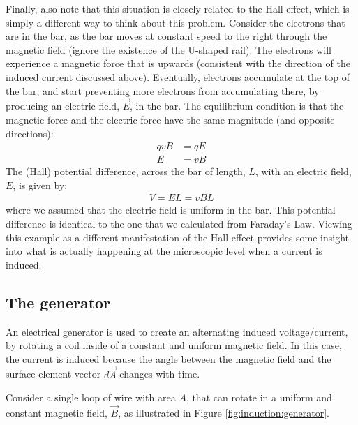 Finally, also note that this situation is closely related to the Hall effect, which is simply a different way to think about this problem. Consider the electrons that are in the bar, as the bar moves at constant speed to the right through the magnetic field (ignore the existence of the U-shaped rail). The electrons will experience a magnetic force that is upwards (consistent with the direction of the induced current discussed above). Eventually, electrons accumulate at the top of the bar, and start preventing more electrons from accumulating there, by producing an electric field, $\vec E$, in the bar. The equilibrium condition is that the magnetic force and the electric force have the same magnitude (and opposite directions):
\begin{align*}
qvB &= qE\\
E &= vB
\end{align*}
The (Hall) potential difference, across the bar of length, $L$, with an electric field, $E$, is given by:
\begin{align*}
V = EL = vBL
\end{align*}
where we assumed that the electric field is uniform in the bar. This potential difference is identical to the one that we calculated from Faraday's Law. Viewing this example as a different manifestation of the Hall effect provides some insight into what is actually happening at the microscopic level when a current is induced. 
\subsection{The generator}
An electrical generator is used to create an alternating induced voltage/current, by rotating a coil inside of a constant and uniform magnetic field. In this case, the current is induced because the angle between the magnetic field and the surface element vector $d\vec A$ changes with time.

Consider a single loop of wire with area $A$, that can rotate in a uniform and constant magnetic field, $\vec B$, as illustrated in Figure \ref{fig:induction:generator}. 


